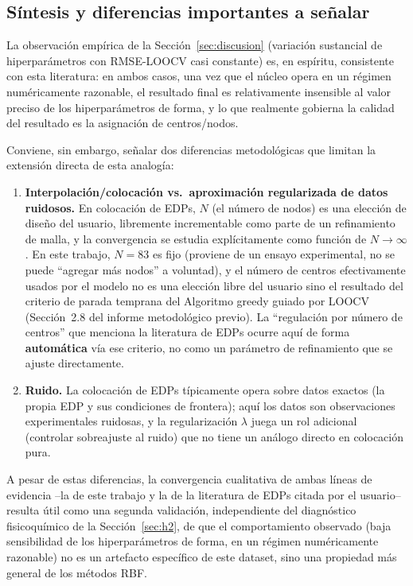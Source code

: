 \documentclass[11pt,a4paper]{article}
\begin{document}
\subsection{S\'intesis y diferencias importantes a se\~nalar}

La observaci\'on emp\'irica de la Secci\'on~\ref{sec:discusion} (variaci\'on
sustancial de hiperpar\'ametros con RMSE-LOOCV casi constante) es, en
esp\'iritu, consistente con esta literatura: en ambos casos, una vez que el
n\'ucleo opera en un r\'egimen num\'ericamente razonable, el resultado final
es relativamente insensible al valor preciso de los hiperpar\'ametros de
forma, y lo que realmente gobierna la calidad del resultado es la asignaci\'on
de centros/nodos.

Conviene, sin embargo, se\~nalar dos diferencias metodol\'ogicas que
limitan la extensi\'on directa de esta analog\'ia:

\begin{enumerate}
    \item \textbf{Interpolaci\'on/colocaci\'on vs.\ aproximaci\'on
    regularizada de datos ruidosos.} En colocaci\'on de EDPs, $N$ (el n\'umero
    de nodos) es una elecci\'on de dise\~no del usuario, libremente
    incrementable como parte de un refinamiento de malla, y la convergencia
    se estudia expl\'icitamente como funci\'on de $N\to\infty$. En este
    trabajo, $N=83$ es fijo (proviene de un ensayo experimental, no se puede
    ``agregar m\'as nodos'' a voluntad), y el n\'umero de centros efectivamente
    usados por el modelo no es una elecci\'on libre del usuario sino el
    resultado del criterio de parada temprana del Algoritmo greedy guiado
    por LOOCV (Secci\'on~2.8 del informe metodol\'ogico previo). La
    ``regulaci\'on por n\'umero de centros'' que menciona la literatura de
    EDPs ocurre aqu\'i de forma \textbf{autom\'atica} v\'ia ese criterio, no
    como un par\'ametro de refinamiento que se ajuste directamente.

    \item \textbf{Ruido.} La colocaci\'on de EDPs t\'ipicamente opera sobre
    datos exactos (la propia EDP y sus condiciones de frontera); aqu\'i los
    datos son observaciones experimentales ruidosas, y la regularizaci\'on
    $\lambda$ juega un rol adicional (controlar sobreajuste al ruido) que no
    tiene un an\'alogo directo en colocaci\'on pura.
\end{enumerate}

A pesar de estas diferencias, la convergencia cualitativa de ambas l\'ineas
de evidencia --la de este trabajo y la de la literatura de EDPs citada por
el usuario-- resulta \'util como una segunda validaci\'on, independiente del
diagn\'ostico fisicoqu\'imico de la Secci\'on~\ref{sec:h2}, de que el
comportamiento observado (baja sensibilidad de los hiperpar\'ametros de
forma, en un r\'egimen num\'ericamente razonable) no es un artefacto
espec\'ifico de este dataset, sino una propiedad m\'as general de los
m\'etodos RBF.
\end{document}
